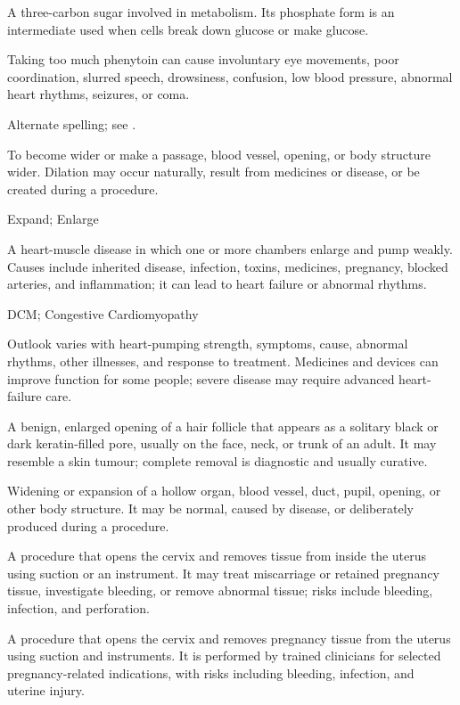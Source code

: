  A three-carbon sugar involved in metabolism. Its phosphate form is an intermediate used when cells break down glucose or make glucose.

 Taking too much phenytoin can cause involuntary eye movements, poor coordination, slurred speech, drowsiness, confusion, low blood pressure, abnormal heart rhythms, seizures, or coma.

 Alternate spelling; see .


 To become wider or make a passage, blood vessel, opening, or body structure wider. Dilation may occur naturally, result from medicines or disease, or be created during a procedure.

\synonyms
Expand; Enlarge

 A heart-muscle disease in which one or more chambers enlarge and pump weakly. Causes include inherited disease, infection, toxins, medicines, pregnancy, blocked arteries, and inflammation; it can lead to heart failure or abnormal rhythms.

\synonyms
DCM; Congestive Cardiomyopathy

 Outlook varies with heart-pumping strength, symptoms, cause, abnormal rhythms, other illnesses, and response to treatment. Medicines and devices can improve function for some people; severe disease may require advanced heart-failure care.

 A benign, enlarged opening of a hair follicle that appears as a solitary black or dark keratin-filled pore, usually on the face, neck, or trunk of an adult. It may resemble a skin tumour; complete removal is diagnostic and usually curative.

 Widening or expansion of a hollow organ, blood vessel, duct, pupil, opening, or other body structure. It may be normal, caused by disease, or deliberately produced during a procedure.

 A procedure that opens the cervix and removes tissue from inside the uterus using suction or an instrument. It may treat miscarriage or retained pregnancy tissue, investigate bleeding, or remove abnormal tissue; risks include bleeding, infection, and perforation.

 A procedure that opens the cervix and removes pregnancy tissue from the uterus using suction and instruments. It is performed by trained clinicians for selected pregnancy-related indications, with risks including bleeding, infection, and uterine injury.

